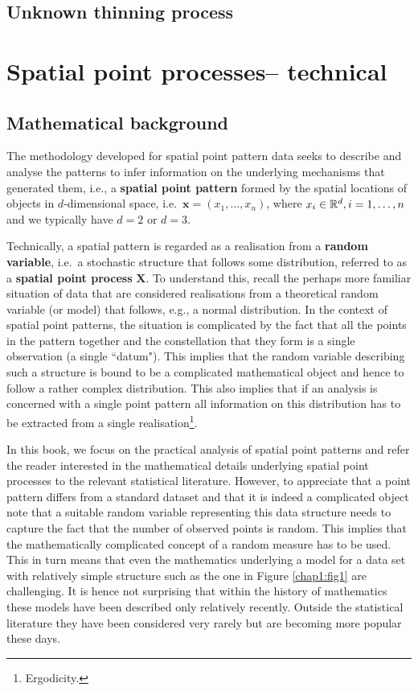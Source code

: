 \subsection{Unknown thinning process}

\section{Spatial point processes-- technical}
\subsection{Mathematical background}\label{ch1_maths}
The methodology developed for spatial point pattern data seeks to describe and analyse the patterns to infer information on the underlying mechanisms that generated them, i.e., a \textbf{spatial point pattern} formed by the spatial locations of objects in $d$-dimensional space, i.e.\ $\mathbf{x}=(x_1, \ldots, x_n)$, where $x_i \in \mathbb{R}^d, i = 1, \ldots, n$ and we typically have $d = 2$ or $d = 3$. 


Technically, a spatial pattern is regarded as a realisation from a \textbf{random variable}, i.e.\  a stochastic structure that follows some distribution, referred to as a \textbf{spatial point process} $\mathbf{X}$. To understand this, recall the perhaps more familiar situation of data that are considered realisations from a theoretical random variable (or model) that follows, e.g., a normal distribution. In the context of spatial point patterns, the situation is complicated by the fact that all the points in the pattern together and the constellation that they form is a single observation (a single ``datum"). This implies that the random variable describing such a structure is bound to be a complicated mathematical object and hence to follow a rather complex distribution. This also implies that if an analysis is concerned with a single point pattern all information on this distribution has to be extracted from a single realisation\footnote{Ergodicity.}.

In this book, we focus on the practical analysis of spatial point patterns and refer the reader interested in the mathematical  details underlying spatial point processes to the relevant statistical literature.  However, to appreciate that a point pattern differs from a standard dataset and that it is indeed a complicated object note that a suitable random variable representing this data structure needs to capture the fact that the number of observed points is random. This implies that the mathematically complicated concept of a random measure has to be used. This in turn means that even the mathematics underlying a model for a data set with relatively simple structure such as the one in Figure \ref{chap1:fig1} are challenging. It is hence not surprising that within the history of mathematics these models have been described only relatively recently. Outside the statistical literature they have been considered very rarely but are becoming more popular these days.

